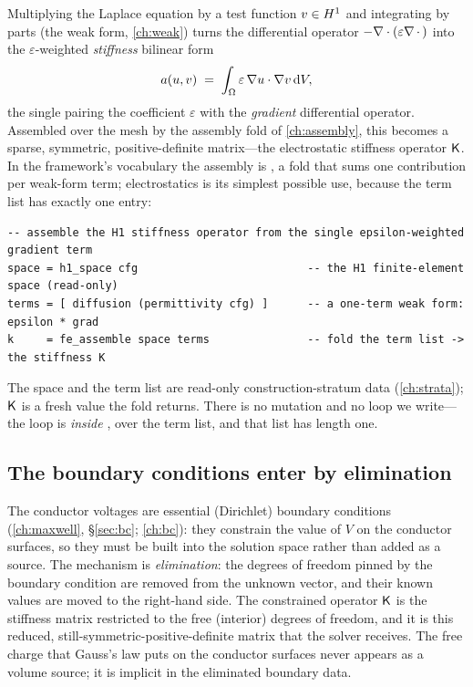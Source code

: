 Multiplying the Laplace equation by a test function $v\in H^1$ and integrating by
parts (the weak form, \cref{ch:weak}) turns the differential operator
$-\nabla\cdot(\varepsilon\nabla\,\cdot\,)$ into the $\varepsilon$-weighted \emph{stiffness}
bilinear form
\begin{equation}
  a(u,v) \;=\; \int_\Omega \varepsilon\,\nabla u \cdot \nabla v \,\mathrm{d}V ,
  \label{eq:es-bilinear-ch39}
\end{equation}
the single  pairing the coefficient $\varepsilon$ with the
\emph{gradient} differential operator. Assembled over the mesh by the
assembly fold of \cref{ch:assembly}, this becomes a sparse, symmetric,
positive-definite matrix---the electrostatic stiffness operator $\mathsf{K}$. In the
framework's vocabulary the assembly is , a fold that sums one
contribution per weak-form term; electrostatics is its simplest possible use,
because the term list has exactly one entry:
\begin{lstlisting}[style=l4style]
-- assemble the H1 stiffness operator from the single epsilon-weighted gradient term
space = h1_space cfg                          -- the H1 finite-element space (read-only)
terms = [ diffusion (permittivity cfg) ]      -- a one-term weak form: epsilon * grad
k     = fe_assemble space terms               -- fold the term list -> the stiffness K
\end{lstlisting}
The space and the term list are read-only construction-stratum data
(\cref{ch:strata}); $\mathsf{K}$ is a fresh value the fold returns. There is no mutation
and no loop we write---the loop is \emph{inside} , over the term
list, and that list has length one.

\subsection{The boundary conditions enter by elimination}

The conductor voltages are essential (Dirichlet) boundary conditions
(\cref{ch:maxwell}, \S\ref{sec:bc}; \cref{ch:bc}): they constrain the value of $V$
on the conductor surfaces, so they must be built into the solution space rather
than added as a source. The mechanism is \emph{elimination}: the degrees of
freedom pinned by the boundary condition are removed from the unknown vector, and
their known values are moved to the right-hand side. The constrained operator
$\mathsf{K}$ is the stiffness matrix restricted to the free (interior) degrees of
freedom, and it is this reduced, still-symmetric-positive-definite matrix that the
solver receives. The free charge that Gauss's law puts on the conductor surfaces
never appears as a volume source; it is implicit in the eliminated boundary data.

